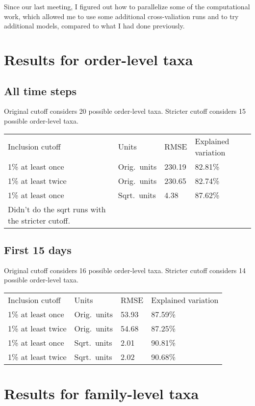 \documentclass{article}
\begin{document}
Since our last meeting, I figured out how to parallelize some of the
computational work, which allowed me to use some additional
cross-valiation runs and to try additional models, compared to what I
had done previously.


\section{Results for order-level taxa}

\subsection{All time steps}

Original cutoff considers 20 possible order-level taxa.
Stricter cutoff considers 15 possible order-level taxa.

\begin{tabular}{llll}
Inclusion cutoff & Units  & RMSE & Explained variation\\
1\% at least once  & Orig.~units & 230.19 & 82.81\%\\
1\% at least twice & Orig.~units & 230.65 & 82.74\%\\
1\% at least once  & Sqrt.~units &   4.38 & 87.62\%\\
Didn't do the sqrt runs with the stricter cutoff.
\end{tabular}




\subsection{First 15 days}

Original cutoff considers 16 possible order-level taxa.
Stricter cutoff considers 14 possible order-level taxa.

\begin{tabular}{llll}
Inclusion cutoff & Units  & RMSE & Explained variation\\
1\% at least once  & Orig.~units & 53.93 & 87.59\%\\
1\% at least twice & Orig.~units & 54.68 & 87.25\%\\
1\% at least once  & Sqrt.~units & 2.01 & 90.81\%\\
1\% at least twice & Sqrt.~units & 2.02 & 90.68\%
\end{tabular}



\section{Results for family-level taxa}
\end{document}
